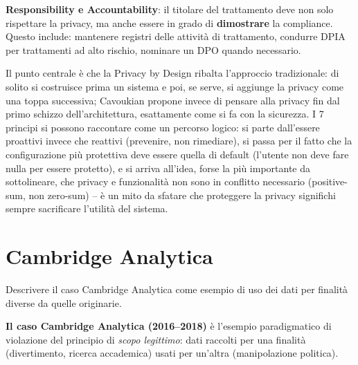 \documentclass[a4paper,11pt]{article}
\begin{document}
\textbf{Responsibility e Accountability}: il titolare del trattamento deve non solo rispettare la privacy, ma anche essere in grado di \textbf{dimostrare} la compliance. Questo include: mantenere registri delle attivit\`{a} di trattamento, condurre DPIA per trattamenti ad alto rischio, nominare un DPO quando necessario.

\begin{nota}
Il punto centrale \`{e} che la Privacy by Design ribalta l'approccio tradizionale: di solito si costruisce prima un sistema e poi, se serve, si aggiunge la privacy come una toppa successiva; Cavoukian propone invece di pensare alla privacy fin dal primo schizzo dell'architettura, esattamente come si fa con la sicurezza. I 7 principi si possono raccontare come un percorso logico: si parte dall'essere proattivi invece che reattivi (prevenire, non rimediare), si passa per il fatto che la configurazione pi\`{u} protettiva deve essere quella di default (l'utente non deve fare nulla per essere protetto), e si arriva all'idea, forse la pi\`{u} importante da sottolineare, che privacy e funzionalit\`{a} non sono in conflitto necessario (positive-sum, non zero-sum) -- \`{e} un mito da sfatare che proteggere la privacy significhi sempre sacrificare l'utilit\`{a} del sistema.
\end{nota}

\section{Cambridge Analytica}

\begin{domanda}
Descrivere il caso Cambridge Analytica come esempio di uso dei dati per finalit\`{a} diverse da quelle originarie.
\end{domanda}

\textbf{Il caso Cambridge Analytica (2016--2018)} \`{e} l'esempio paradigmatico di violazione del principio di \emph{scopo legittimo}: dati raccolti per una finalit\`{a} (divertimento, ricerca accademica) usati per un'altra (manipolazione politica).
\end{document}

